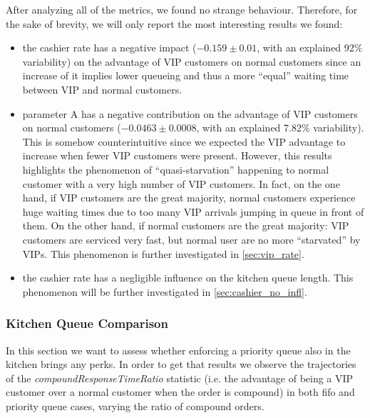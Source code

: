 After analyzing all of the metrics, we found no strange behaviour. Therefore, for the sake of brevity, we will only report the most interesting results we found:
\begin{itemize}
  \item the cashier rate has a negative impact ($-0.159 \pm 0.01$, with an explained 92\% variability) on the advantage of VIP customers 
    on normal customers since an increase of it implies lower queueing and thus 
    a more ``equal'' waiting time between VIP and normal customers.
  \item parameter A has a negative contribution on the advantage of VIP       
    customers on normal customers ($-0.0463 \pm 0.0008$, with an explained 7.82\% variability). This is somehow counterintuitive since we 
    expected the VIP advantage to increase when fewer VIP customers were present.
    However, this results highlights the phenomenon of ``quasi-starvation''
    happening to normal customer with a very high number of VIP customers. In fact, on the one hand, if VIP customers are the great majority, normal customers experience huge waiting times due to too many VIP arrivals jumping in queue in front of them. On the other hand, if normal customers are the great majority: VIP customers are serviced very fast, but normal user are no more ``starvated'' by VIPs. 
    This phenomenon is further investigated in \cref{sec:vip_rate}.
  \item the cashier rate has a negligible influence on the kitchen queue length.  
    This phenomenon will be further investigated in \cref{sec:cashier_no_infl}.
\end{itemize} %

\subsubsection{Kitchen Queue Comparison}

In this section we want to assess whether enforcing a priority queue also in the kitchen brings any perks. In order to get that results we observe the trajectories of the \emph{compoundResponseTimeRatio} statistic (i.e. the advantage of being a VIP customer over a normal customer when the order is compound) in both fifo and priority queue cases, varying the ratio of compound orders.


